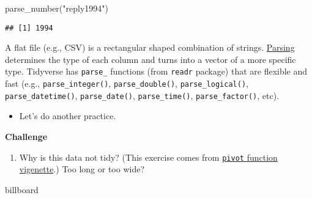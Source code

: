 \documentclass[
]{book}
\newenvironment{Shaded}{\begin{snugshade}}{\end{snugshade}}
\newcommand{\FunctionTok}[1]{\textcolor[rgb]{0.00,0.00,0.00}{#1}}
\newcommand{\NormalTok}[1]{#1}
\newcommand{\StringTok}[1]{\textcolor[rgb]{0.31,0.60,0.02}{#1}}
\providecommand{\tightlist}{%
  \setlength{\itemsep}{0pt}\setlength{\parskip}{0pt}}
\begin{document}
\begin{Shaded}
\begin{Highlighting}[]
\FunctionTok{parse\_number}\NormalTok{(}\StringTok{"reply1994"}\NormalTok{)}
\end{Highlighting}
\end{Shaded}

\begin{verbatim}
## [1] 1994
\end{verbatim}

A flat file (e.g., CSV) is a rectangular shaped combination of strings. \href{https://cran.r-project.org/web/packages/readr/vignettes/readr.html}{Parsing} determines the type of each column and turns into a vector of a more specific type. Tidyverse has \texttt{parse\_} functions (from \texttt{readr} package) that are flexible and fast (e.g., \texttt{parse\_integer()}, \texttt{parse\_double()}, \texttt{parse\_logical()}, \texttt{parse\_datetime()}, \texttt{parse\_date()}, \texttt{parse\_time()}, \texttt{parse\_factor()}, etc).

\begin{itemize}
\tightlist
\item
  Let's do another practice.
\end{itemize}

\textbf{Challenge}

\begin{enumerate}
\def\labelenumi{\arabic{enumi}.}
\tightlist
\item
  Why is this data not tidy? (This exercise comes from \href{https://tidyr.tidyverse.org/articles/pivot.html}{\texttt{pivot} function vigenette}.) Too long or too wide?
\end{enumerate}

\begin{Shaded}
\begin{Highlighting}[]
\NormalTok{billboard}
\end{Highlighting}
\end{Shaded}
\end{document}
